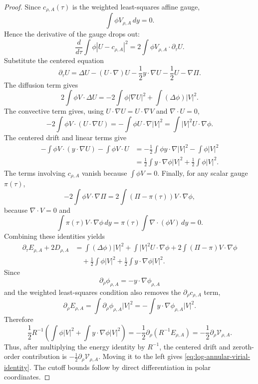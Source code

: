 \documentclass[11pt]{amsart}
\numberwithin{equation}{section}
\theoremstyle{plain}
\theoremstyle{definition}
\theoremstyle{remark}
\begin{document}
\begin{proof}
Since \(c_{\rho,A}(\tau)\) is the weighted least-squares affine gauge,
\[
   \int\phi V_{\rho,A}\,dy=0 .
\]
Hence the derivative of the gauge drops out:
\[
   \frac{d}{d\tau}\int\phi |U-c_{\rho,A}|^2
   =
   2\int\phi V_{\rho,A}\cdot\partial_\tau U .
\]
Substitute the centered equation
\[
   \partial_\tau U
   =
   \Delta U-(U\cdot\nabla)U-\frac12y\cdot\nabla U-\frac12U-\nabla\Pi .
\]
The diffusion term gives
\[
   2\int\phi V\cdot\Delta U
   =
   -2\int\phi|\nabla U|^2+\int(\Delta\phi)|V|^2 .
\]
The convective term gives, using \(U\cdot\nabla U=U\cdot\nabla V\) and
\(\nabla\cdot U=0\),
\[
   -2\int\phi V\cdot(U\cdot\nabla U)
   =
   -\int\phi U\cdot\nabla |V|^2
   =
   \int |V|^2U\cdot\nabla\phi .
\]
The centered drift and linear terms give
\[
\begin{aligned}
   -\int\phi V\cdot(y\cdot\nabla U)-\int\phi V\cdot U
   &=
   -\frac12\int\phi y\cdot\nabla |V|^2
   -\int\phi |V|^2                                      \\
   &=
   \frac12\int y\cdot\nabla\phi |V|^2
   +\frac12\int\phi |V|^2 .
\end{aligned}
\]
The terms involving \(c_{\rho,A}\) vanish because
\(\int\phi V=0\).  Finally, for any scalar gauge \(\pi(\tau)\),
\[
   -2\int\phi V\cdot\nabla\Pi
   =
   2\int(\Pi-\pi(\tau))V\cdot\nabla\phi,
\]
because \(\nabla\cdot V=0\) and
\[
   \int \pi(\tau)V\cdot\nabla\phi\,dy
   =
   \pi(\tau)\int\nabla\cdot(\phi V)\,dy=0 .
\]
Combining these identities yields
\[
\begin{aligned}
   \partial_\tau E_{\rho,A}+2D_{\rho,A}
   &=
   \int(\Delta\phi)|V|^2
   +\int |V|^2U\cdot\nabla\phi
   +2\int(\Pi-\pi)V\cdot\nabla\phi                         \\
   &\quad
   +\frac12\int\phi |V|^2
   +\frac12\int y\cdot\nabla\phi |V|^2 .
\end{aligned}
\]
Since
\[
   \partial_\rho\phi_{\rho,A}=-y\cdot\nabla\phi_{\rho,A}
\]
and the weighted least-squares condition also removes the
\(\partial_\rho c_{\rho,A}\) term,
\[
   \partial_\rho E_{\rho,A}
   =
   \int \partial_\rho\phi_{\rho,A}|V|^2
   =
   -\int y\cdot\nabla\phi_{\rho,A}|V|^2 .
\]
Therefore
\[
   \frac12 R^{-1}\left(
      \int\phi |V|^2+
      \int y\cdot\nabla\phi |V|^2
   \right)
   =
   -\frac12\partial_\rho(R^{-1}E_{\rho,A})
   =
   -\frac12\partial_\rho\mathcal V_{\rho,A}.
\]
Thus, after multiplying the energy identity by \(R^{-1}\), the centered drift
and zeroth-order contribution is
\(-\frac12\partial_\rho\mathcal V_{\rho,A}\).  Moving it to the left gives
\eqref{eq:log-annular-virial-identity}.  The cutoff bounds follow by direct
differentiation in polar coordinates.
\end{proof}
\end{document}
